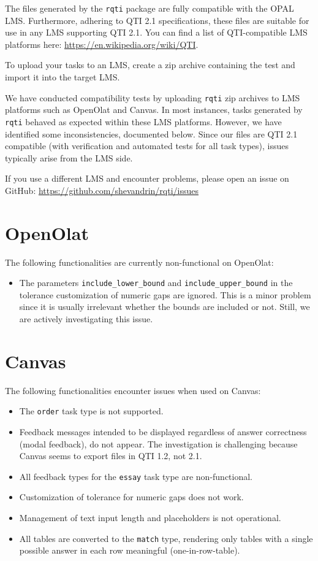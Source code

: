 \documentclass[twoside]{tufte-book}
\providecommand{\tightlist}{%
  \setlength{\itemsep}{0pt}\setlength{\parskip}{0pt}}
\begin{document}
The files generated by the \texttt{rqti} package are fully compatible with the OPAL LMS. Furthermore, adhering to QTI 2.1 specifications, these files are suitable for use in any LMS supporting QTI 2.1. You can find a list of QTI-compatible LMS platforms here: \url{https://en.wikipedia.org/wiki/QTI}.

To upload your tasks to an LMS, create a zip archive containing the test and import it into the target LMS.

We have conducted compatibility tests by uploading \texttt{rqti} zip archives to LMS platforms such as OpenOlat and Canvas. In most instances, tasks generated by \texttt{rqti} behaved as expected within these LMS platforms. However, we have identified some inconsistencies, documented below. Since our files are QTI 2.1 compatible (with verification and automated tests for all task types), issues typically arise from the LMS side.

If you use a different LMS and encounter problems, please open an issue on GitHub: \url{https://github.com/shevandrin/rqti/issues}

\section{OpenOlat}\label{openolat}

The following functionalities are currently non-functional on OpenOlat:

\begin{itemize}
\tightlist
\item
  The parameters \texttt{include\_lower\_bound} and \texttt{include\_upper\_bound} in the tolerance customization of numeric gaps are ignored. This is a minor problem since it is usually irrelevant whether the bounds are included or not. Still, we are actively investigating this issue.
\end{itemize}

\section{Canvas}\label{canvas}

The following functionalities encounter issues when used on Canvas:

\begin{itemize}
\tightlist
\item
  The \texttt{order} task type is not supported.
\item
  Feedback messages intended to be displayed regardless of answer correctness (modal feedback), do not appear. The investigation is challenging because Canvas seems to export files in QTI 1.2, not 2.1.
\item
  All feedback types for the \texttt{essay} task type are non-functional.
\item
  Customization of tolerance for numeric gaps does not work.
\item
  Management of text input length and placeholders is not operational.
\item
  All tables are converted to the \texttt{match} type, rendering only tables with a single possible answer in each row meaningful (one-in-row-table).
\end{itemize}
\end{document}
